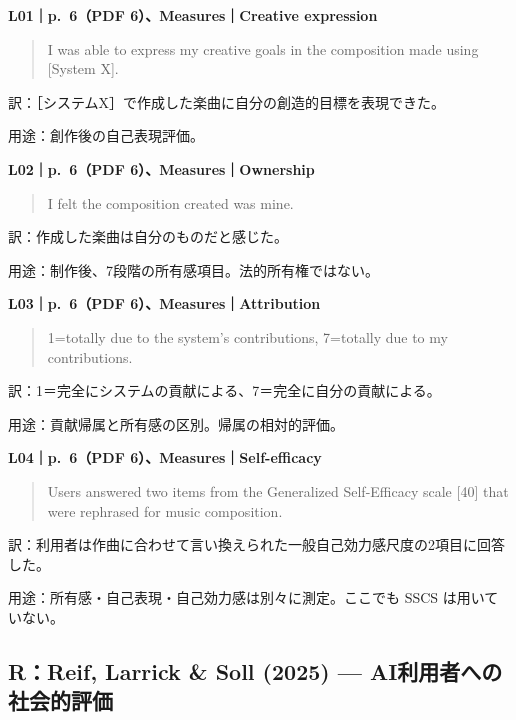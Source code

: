 \documentclass[
  11pt,
  a4paper,
]{article}
\begin{document}

\textbf{L01｜p.~6（PDF 6）、Measures｜Creative expression}

\begin{quote}
I was able to express my creative goals in the composition made using
{[}System X{]}.
\end{quote}

訳：［システムX］で作成した楽曲に自分の創造的目標を表現できた。

用途：創作後の自己表現評価。


\textbf{L02｜p.~6（PDF 6）、Measures｜Ownership}

\begin{quote}
I felt the composition created was mine.
\end{quote}

訳：作成した楽曲は自分のものだと感じた。

用途：制作後、7段階の所有感項目。法的所有権ではない。


\textbf{L03｜p.~6（PDF 6）、Measures｜Attribution}

\begin{quote}
1=totally due to the system's contributions, 7=totally due to my
contributions.
\end{quote}

訳：1＝完全にシステムの貢献による、7＝完全に自分の貢献による。

用途：貢献帰属と所有感の区別。帰属の相対的評価。


\textbf{L04｜p.~6（PDF 6）、Measures｜Self-efficacy}

\begin{quote}
Users answered two items from the Generalized Self-Efficacy scale
{[}40{]} that were rephrased for music composition.
\end{quote}

訳：利用者は作曲に合わせて言い換えられた一般自己効力感尺度の2項目に回答した。

用途：所有感・自己表現・自己効力感は別々に測定。ここでも SSCS
は用いていない。

\subsection{R：Reif, Larrick \& Soll (2025) ---
AI利用者への社会的評価}\label{rreif-larrick-soll-2025-aiux5229ux7528ux8005ux3078ux306eux793eux4f1aux7684ux8a55ux4fa1}
\end{document}
